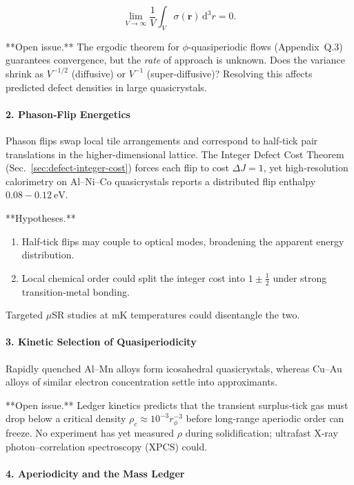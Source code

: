 \documentclass[11pt,oneside]{book}
\begin{document}
\[
   \lim_{V\to\infty}\frac{1}{V}\int_V \sigma(\mathbf r)\,\mathrm d^3r = 0.
\]

**Open issue.**  
The ergodic theorem for \(\phi\)-quasiperiodic flows (Appendix~Q.3)
guarantees convergence, but the \emph{rate} of approach is unknown.
Does the variance shrink as \(V^{-1/2}\) (diffusive) or \(V^{-1}\)
(super-diffusive)?  
Resolving this affects predicted defect densities in large quasicrystals.

\paragraph*{2. Phason‐Flip Energetics}

Phason flips swap local tile arrangements and correspond
to half‐tick pair translations in the higher-dimensional lattice.
The Integer Defect Cost Theorem (Sec.~\ref{sec:defect-integer-cost})
forces each flip to cost \(\Delta J = 1\), yet
high‐resolution calorimetry on Al–Ni–Co quasicrystals
reports a distributed flip enthalpy
\(0.08\!-\!0.12~\text{eV}\).

**Hypotheses.**
\begin{enumerate}[label=\textbf{H\arabic*},leftmargin=1.2cm]
\item Half‐tick flips may couple to optical modes, broadening the
      apparent energy distribution.
\item Local chemical order could split the integer cost into
      \(1\pm\tfrac12\) under strong transition‐metal bonding.
\end{enumerate}
Targeted \(\mu\)SR studies at mK temperatures could disentangle the two.

\paragraph*{3. Kinetic Selection of Quasiperiodicity}

Rapidly quenched Al–Mn alloys form icosahedral
quasicrystals, whereas Cu–Au alloys of similar electron concentration
settle into approximants.

**Open issue.**  
Ledger kinetics predicts that the transient surplus‐tick gas
must drop below a critical density
\(\rho_c \approx 10^{-3} r_\phi^{-3}\) before long‐range
aperiodic order can freeze.  
No experiment has yet measured \(\rho\) during solidification;
ultrafast X-ray photon–correlation spectroscopy (XPCS) could.

\paragraph*{4. Aperiodicity and the Mass Ledger}
\end{document}
